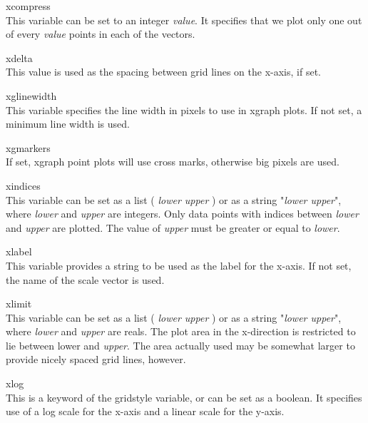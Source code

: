\begin{description}
\item{\et xcompress}\\
This variable can be set to an integer {\it value}.  It specifies that
we plot only one out of every {\it value} points in each of the
vectors.

\item{\et xdelta}\\
This value is used as the spacing between grid lines on the x-axis, if
set.

\item{\et xglinewidth}\\
This variable specifies the line width in pixels to use in {\cb
xgraph} plots.  If not set, a minimum line width is used.

\item{\et xgmarkers}\\
If set, {\cb xgraph} point plots will use cross marks, otherwise big
pixels are used.

\item{\et xindices}\\
This variable can be set as a list {\vt (} {\it lower upper} {\vt )}
or as a string {\vt "}{\it lower upper}{\vt "}, where {\it lower} and
{\it upper} are integers.  Only data points with indices between {\it
lower} and {\it upper} are plotted.  The value of {\it upper} must be
greater or equal to {\it lower}.

\item{\et xlabel}\\
This variable provides a string to be used as the label for the
x-axis.  If not set, the name of the scale vector is used.

\item{\et xlimit}\\
This variable can be set as a list {\vt (} {\it lower upper} {\vt )}
or as a string {\vt "}{\it lower upper}{\vt "}, where {\it lower} and
{\it upper} are reals.  The plot area in the x-direction is restricted
to lie between {\vt lower} and {\it upper}.  The area actually used
may be somewhat larger to provide nicely spaced grid lines, however.

\item{\et xlog}\\
This is a keyword of the {\et gridstyle} variable, or can be set as a
boolean.  It specifies use of a log scale for the x-axis and a linear
scale for the y-axis.


\end{description}
